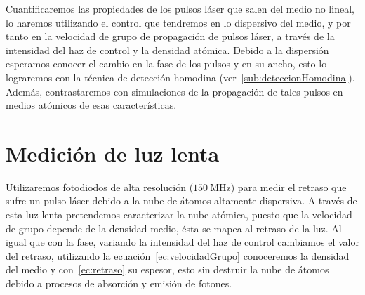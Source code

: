 Cuantificaremos las propiedades de los pulsos láser que salen del medio no lineal, lo haremos utilizando el control que tendremos en lo dispersivo del medio, y por tanto en la velocidad de grupo de propagación de pulsos láser, a través de la intensidad del haz de control y la densidad atómica. Debido a la dispersión esperamos conocer el cambio en la fase de los pulsos y en su ancho, esto lo lograremos con la técnica de detección homodina (ver~\ref{sub:deteccionHomodina}). Además, contrastaremos con simulaciones de la propagación de tales pulsos en medios atómicos de esas características.

\section{\label{sec:medicionLuzLenta}Medición de luz lenta}

Utilizaremos fotodiodos de alta resolución ($\SI{150}{\mega\hertz}$) para medir el retraso que sufre un pulso láser debido a la nube de átomos altamente dispersiva. A través de esta luz lenta pretendemos caracterizar la nube atómica, puesto que la velocidad de grupo depende de la densidad medio, ésta se mapea al retraso de la luz. Al igual que con la fase, variando la intensidad del haz de control cambiamos el valor del retraso, utilizando la ecuación~\ref{ec:velocidadGrupo} conoceremos la densidad del medio y con~\ref{ec:retraso} su espesor, esto sin destruir la nube de átomos debido a procesos de absorción y emisión de fotones.